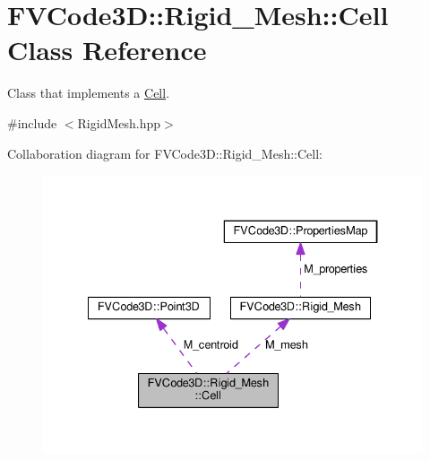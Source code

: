 \hypertarget{classFVCode3D_1_1Rigid__Mesh_1_1Cell}{}\section{F\+V\+Code3D\+:\+:Rigid\+\_\+\+Mesh\+:\+:Cell Class Reference}
\label{classFVCode3D_1_1Rigid__Mesh_1_1Cell}


Class that implements a \hyperlink{classFVCode3D_1_1Rigid__Mesh_1_1Cell}{Cell}.  




{\ttfamily \#include $<$Rigid\+Mesh.\+hpp$>$}



Collaboration diagram for F\+V\+Code3D\+:\+:Rigid\+\_\+\+Mesh\+:\+:Cell\+:
\nopagebreak
\begin{figure}[H]
\begin{center}
\leavevmode
\includegraphics[width=334pt]{classFVCode3D_1_1Rigid__Mesh_1_1Cell__coll__graph}
\end{center}
\end{figure}
